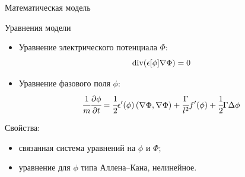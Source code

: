 \begin{frame}{Математическая модель}
\vspace{-0.5cm}
\begin{block}{Уравнения модели}
\begin{itemize}
	\item Уравнение электрического потенциала $\Phi$:
	\begin{equation}
		\operatorname{{div}}(\epsilon[\phi] \nabla \Phi) = 0
		\label{equation_potential}
	\end{equation}
	\item Уравнение фазового поля $\phi$:
	\begin{equation}
		\cfrac{1}{m} \cfrac{\partial \phi}{\partial t} = \cfrac{1}{2} \epsilon'(\phi) \left( \nabla \Phi, \nabla \Phi \right) + \cfrac{\Gamma}{l^2} f'(\phi) + \cfrac{1}{2} \Gamma \Delta \phi
		\label{equation_phase}
	\end{equation}
\end{itemize}
\end{block}
Свойства:
\begin{itemize}
	\item связанная система уравнений на $\phi$ и $\Phi$;
	\item уравнение для $\phi$ типа Аллена--Кана, нелинейное.
\end{itemize}
\end{frame}


